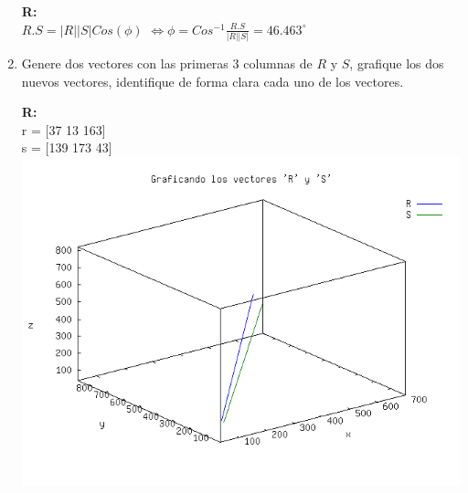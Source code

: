 \begin{enumerate}
	\textbf{R:}\\

	$R.S = |R||S| Cos(\phi)$
	$\Leftrightarrow \phi = Cos^{-1}\frac{R.S}{|R||S|} = 46.463^{\circ}$\\

	\item Genere dos vectores con las primeras 3 columnas de $R$ y $S$, grafique los dos nuevos vectores,
		identifique de forma clara cada uno de los vectores.

	\textbf{R:}\\

	r = [37  13 163] \\
	s = [139 173  43] \\

	\includegraphics[scale=0.6]{imagenes/vectores.png}

\end{enumerate}

